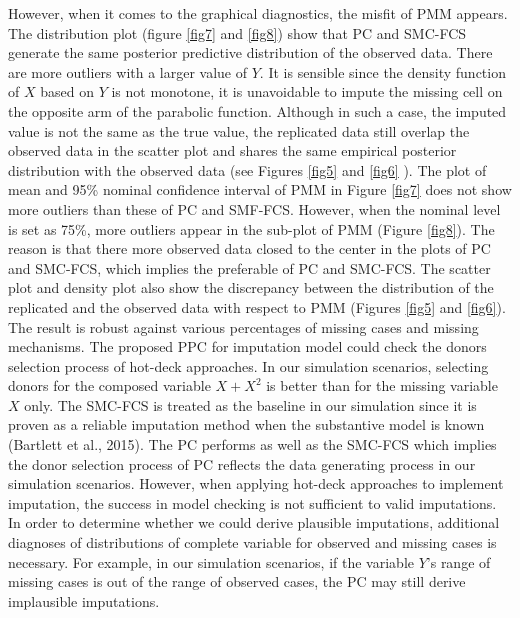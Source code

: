 \documentclass[12pt, fullpage, a4paper]{article}
\begin{document}
However, when it comes to the graphical diagnostics, the misfit of PMM appears. The distribution plot (figure \ref{fig7} and \ref{fig8}) show that PC and SMC-FCS generate the same posterior predictive distribution of the observed data. There are more outliers with a larger value of $Y$. It is sensible since the density function of $X$ based on $Y$ is not monotone, it is unavoidable to impute the missing cell on the opposite arm of the parabolic function. Although in such a case, the imputed value is not the same as the true value, the replicated data still overlap the observed data in the scatter plot and shares the same empirical posterior distribution with the observed data (see Figures \ref{fig5} and \ref{fig6} ). The plot of mean and 95\% nominal confidence interval of PMM in Figure \ref{fig7} does not show more outliers than these of PC and SMF-FCS. However, when the nominal level is set as 75\%, more outliers appear in the sub-plot of PMM (Figure \ref{fig8}). The reason is that there more observed data closed to the center in the plots of PC and SMC-FCS, which implies the preferable of PC and SMC-FCS. The scatter plot and density plot also show the discrepancy between the distribution of the replicated and the observed data with respect to PMM (Figures \ref{fig5} and \ref{fig6}). The result is robust against various percentages of missing cases and missing mechanisms. The proposed PPC for imputation model could check the donors selection process of hot-deck approaches. In our simulation scenarios, selecting donors for the composed variable $X + X^2$ is better than for the missing variable $X$ only. The SMC-FCS is treated as the baseline in our simulation since it is proven as a reliable imputation method when the substantive model is known (Bartlett et al., 2015). The PC performs as well as the SMC-FCS which implies the donor selection process of PC reflects the data generating process in our simulation scenarios. However, when applying hot-deck approaches to implement imputation, the success in model checking is not sufficient to valid imputations. In order to determine whether we could derive plausible imputations, additional diagnoses of distributions of complete variable for observed and missing cases is necessary. For example, in our simulation scenarios, if the variable $Y$'s range of missing cases is out of the range of observed cases, the PC may still derive implausible imputations. 
\end{document}
